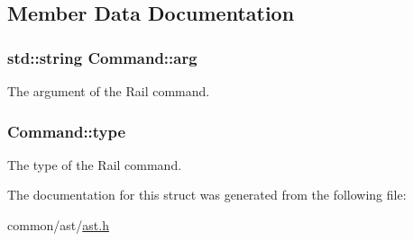 \subsection{Member Data Documentation}
\hypertarget{structCommand_a2764694100839fad40df1dfd7be7145a}{
\subsubsection[{arg}]{\setlength{\rightskip}{0pt plus 5cm}std\-::string Command\-::arg}}\label{structCommand_a2764694100839fad40df1dfd7be7145a}
The argument of the Rail command. \hypertarget{structCommand_a9b682ee6829f8aa99c936997b9107686}{
\subsubsection[{type}]{ Command\-::type}}\label{structCommand_a9b682ee6829f8aa99c936997b9107686}
The type of the Rail command. 

The documentation for this struct was generated from the following file\-:\begin{DoxyCompactItemize}
\item 
common/ast/\hyperlink{ast_8h}{ast.\-h}\end{DoxyCompactItemize}
